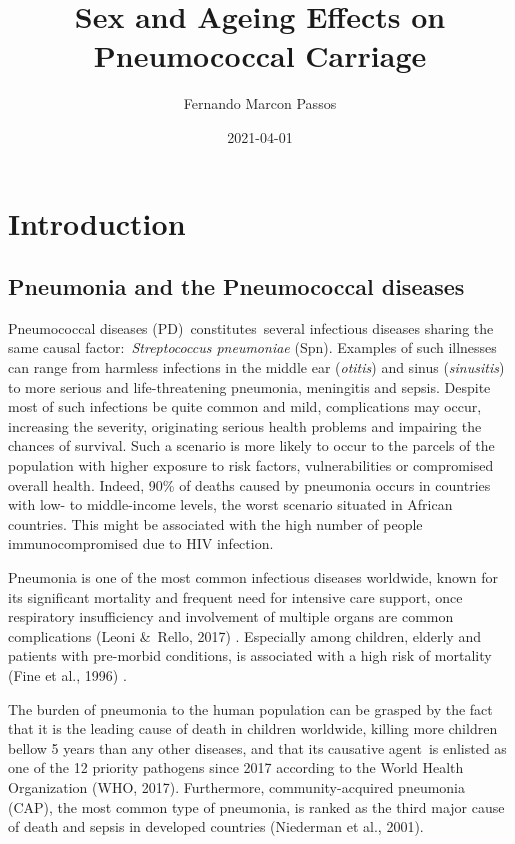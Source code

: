 \documentclass[
]{book}
\title{Sex and Ageing Effects on Pneumococcal Carriage}
\author{Fernando Marcon Passos}
\date{2021-04-01}
\begin{document}
\maketitle

{
\setcounter{tocdepth}{1}
\tableofcontents
}
\hypertarget{intro}{%
\chapter{Introduction}\label{intro}}

\hypertarget{pneumonia-and-the-pneumococcal-diseases}{%
\section{Pneumonia and the Pneumococcal diseases}\label{pneumonia-and-the-pneumococcal-diseases}}

Pneumococcal diseases (PD)~constitutes~several infectious diseases sharing the same causal factor:~\emph{Streptococcus pneumoniae} (Spn). Examples of such illnesses can range from harmless infections in the middle ear (\emph{otitis}) and sinus (\emph{sinusitis}) to more serious and life-threatening pneumonia, meningitis and sepsis. Despite most of such infections be quite common and mild, complications may occur, increasing the severity, originating serious health problems and impairing the chances of survival. Such a scenario is more likely to occur to the parcels of the population with higher exposure to risk factors, vulnerabilities or compromised overall health. Indeed, 90\% of deaths caused by pneumonia occurs in countries with low- to middle-income levels, the worst scenario situated in African countries. This might be associated with the high number of people immunocompromised due to HIV infection.

Pneumonia is one of the most common infectious diseases worldwide, known for its significant mortality and frequent need for intensive care support, once respiratory insufficiency and involvement of multiple organs are common complications (Leoni \&~Rello, 2017) ⁠. Especially among children, elderly and patients with pre-morbid conditions, is associated with a high risk of mortality (Fine et al., 1996) ⁠.

The burden of pneumonia to the human population can be grasped by the fact that it is the leading cause of death in children worldwide, killing more children bellow 5 years than any other diseases, and that its causative agent~is enlisted as one of the 12 priority pathogens since 2017 according to the World Health Organization (WHO, 2017)⁠. Furthermore, community-acquired pneumonia (CAP), the most common type of pneumonia, is ranked as the third major cause of death and sepsis in developed countries (Niederman et al., 2001).
\end{document}
